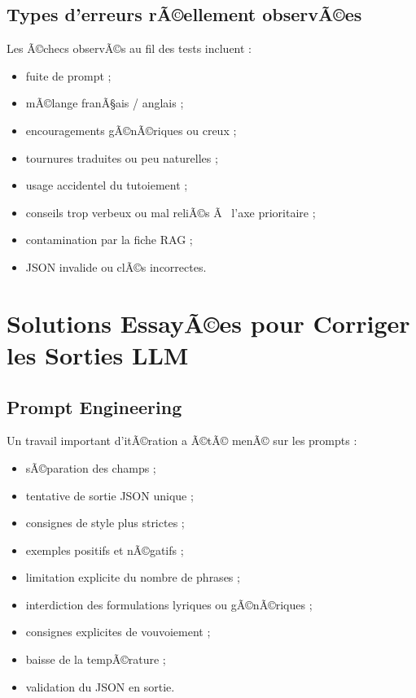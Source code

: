 ﻿\documentclass[12pt,a4paper]{article}
\begin{document}
\subsection{Types d'erreurs rÃ©ellement observÃ©es}
Les Ã©checs observÃ©s au fil des tests incluent :
\begin{itemize}
    \item fuite de prompt ;
    \item mÃ©lange franÃ§ais / anglais ;
    \item encouragements gÃ©nÃ©riques ou creux ;
    \item tournures traduites ou peu naturelles ;
    \item usage accidentel du tutoiement ;
    \item conseils trop verbeux ou mal reliÃ©s Ã  l'axe prioritaire ;
    \item contamination par la fiche RAG ;
    \item JSON invalide ou clÃ©s incorrectes.
\end{itemize}

\section{Solutions EssayÃ©es pour Corriger les Sorties LLM}

\subsection{Prompt Engineering}
Un travail important d'itÃ©ration a Ã©tÃ© menÃ© sur les prompts :
\begin{itemize}
    \item sÃ©paration des champs ;
    \item tentative de sortie JSON unique ;
    \item consignes de style plus strictes ;
    \item exemples positifs et nÃ©gatifs ;
    \item limitation explicite du nombre de phrases ;
    \item interdiction des formulations lyriques ou gÃ©nÃ©riques ;
    \item consignes explicites de vouvoiement ;
    \item baisse de la tempÃ©rature ;
    \item validation du JSON en sortie.
\end{itemize}
\end{document}
